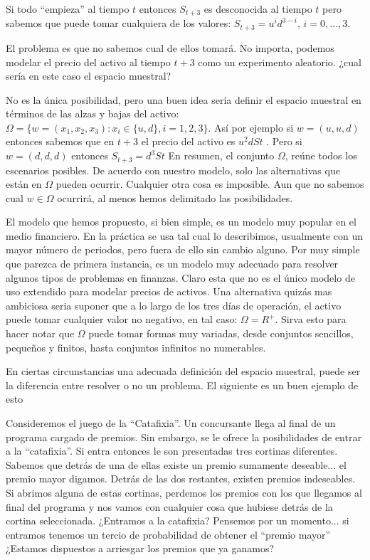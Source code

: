 \documentclass[14pt]{extreport}
\newcounter{ejemplo}[chapter]
\begin{document}
Si todo ``empieza'' al tiempo $t$ entonces $S_{t+3}$ es desconocida al tiempo $t$ pero sabemos que puede tomar cualquiera de los valores:  $S_{t+3}= u^id^{3-i}$, $i = 0,\ldots, 3$.

El problema es que no sabemos cual de ellos tomará. No importa, podemos modelar el precio del activo al tiempo $t + 3$ como un experimento aleatorio. ¿cual sería en este caso el espacio muestral?

No es la única posibilidad, pero una buen idea sería definir el espacio muestral en términos de las alzas y bajas del activo: $\Omega = \{w = (x_1 , x_2, x_3 ):x_i \in \{u, d\}, i = 1, 2, 3\}$. Así por ejemplo si $w = (u, u, d)$ entonces sabemos que en $t + 3$ el 
precio del activo es $u^2dSt$ . Pero si $w = (d, d, d)$ entonces $S_{t+3} = d^3St$ En resumen, el conjunto $\Omega$, reúne
todos los escenarios posibles. De acuerdo con nuestro modelo, solo las alternativas que están en $\Omega$ pueden ocurrir. Cualquier otra cosa es imposible. Aun que no sabemos cual $w \in \Omega$ ocurrirá, al menos hemos
delimitado las posibilidades.

El modelo que hemos propuesto, si bien simple, es un modelo muy popular en el medio financiero. En la práctica se usa tal cual lo describimos, usualmente con un mayor número de periodos, pero fuera de ello sin cambio alguno. Por muy simple que parezca de primera instancia, es un modelo muy adecuado para resolver algunos tipos de problemas en finanzas. Claro esta que no es el único modelo de uso extendido para modelar precios de activos. Una alternativa quizás mas ambiciosa seria suponer que a lo largo de los tres días de operación, el activo puede tomar cualquier valor no negativo, en tal caso: $\Omega = R^+$. Sirva esto para hacer notar que $\Omega$ puede tomar formas muy variadas, desde conjuntos sencillos, pequeños y finitos, hasta conjuntos infinitos no numerables. 

En ciertas circunstancias una adecuada
definición del espacio muestral, puede ser la diferencia entre resolver o no un problema. El siguiente es un buen ejemplo de esto

\noindent\hrulefill

Consideremos el juego de la ``Catafixia''. Un concursante llega al final de un programa cargado de premios. Sin embargo, se le ofrece la posibilidades de entrar a la ``catafixia''. Si entra entonces le son presentadas tres cortinas diferentes. Sabemos que detrás de una de ellas existe un premio sumamente deseable... el premio mayor digamos. Detrás de las dos restantes, existen premios indeseables. Si abrimos alguna de estas cortinas, perdemos los premios con los que llegamos al final del programa y nos vamos con cualquier cosa que hubiese detrás de la cortina seleccionada. ¿Entramos a la catafixia? Pensemos por un momento... si entramos tenemos un tercio de probabilidad de obtener el ``premio mayor'' ¿Estamos dispuestos a arriesgar los premios que ya ganamos? 
\end{document}
